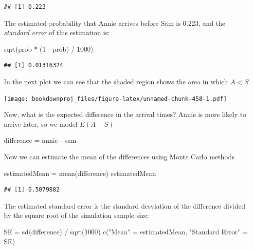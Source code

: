 \documentclass[
]{book}
\newenvironment{Shaded}{\begin{snugshade}}{\end{snugshade}}
\newcommand{\DecValTok}[1]{\textcolor[rgb]{0.00,0.00,0.81}{#1}}
\newcommand{\FunctionTok}[1]{\textcolor[rgb]{0.00,0.00,0.00}{#1}}
\newcommand{\NormalTok}[1]{#1}
\newcommand{\OtherTok}[1]{\textcolor[rgb]{0.56,0.35,0.01}{#1}}
\newcommand{\SpecialCharTok}[1]{\textcolor[rgb]{0.00,0.00,0.00}{#1}}
\newcommand{\StringTok}[1]{\textcolor[rgb]{0.31,0.60,0.02}{#1}}
\theoremstyle{definition}
\theoremstyle{definition}
\theoremstyle{definition}
\theoremstyle{definition}
\theoremstyle{remark}
\begin{document}
\begin{verbatim}
## [1] 0.223
\end{verbatim}

The estimated probability that Annie arrives before Sam is 0.223, and the \emph{standard error} of this estimation is:

\begin{Shaded}
\begin{Highlighting}[]
\FunctionTok{sqrt}\NormalTok{(prob }\SpecialCharTok{*}\NormalTok{ (}\DecValTok{1} \SpecialCharTok{{-}}\NormalTok{ prob) }\SpecialCharTok{/} \DecValTok{1000}\NormalTok{)}
\end{Highlighting}
\end{Shaded}

\begin{verbatim}
## [1] 0.01316324
\end{verbatim}

In the next plot we can see that the shaded region shows the area in which \(A < S\)

\texttt{[image: bookdownproj\_files/figure-latex/unnamed-chunk-458-1.pdf]}

Now, what is the expected difference in the arrival times? Annie is more likely to arrive later, so we model \(E(A-S)\)

\begin{Shaded}
\begin{Highlighting}[]
\NormalTok{difference }\OtherTok{=}\NormalTok{ annie }\SpecialCharTok{{-}}\NormalTok{ sam}
\end{Highlighting}
\end{Shaded}

Now we can estimate the mean of the differences using Monte Carlo methods

\begin{Shaded}
\begin{Highlighting}[]
\NormalTok{estimatedMean }\OtherTok{=} \FunctionTok{mean}\NormalTok{(difference)}
\NormalTok{estimatedMean}
\end{Highlighting}
\end{Shaded}

\begin{verbatim}
## [1] 0.5079882
\end{verbatim}

The estimated standard error is the standard desviation of the difference divided by the square root of the simulation sample size:

\begin{Shaded}
\begin{Highlighting}[]
\NormalTok{SE }\OtherTok{=} \FunctionTok{sd}\NormalTok{(difference) }\SpecialCharTok{/} \FunctionTok{sqrt}\NormalTok{(}\DecValTok{1000}\NormalTok{)}
\FunctionTok{c}\NormalTok{(}\StringTok{"Mean"} \OtherTok{=}\NormalTok{ estimatedMean, }\StringTok{"Standard Error"} \OtherTok{=}\NormalTok{ SE)}
\end{Highlighting}
\end{Shaded}
\end{document}
